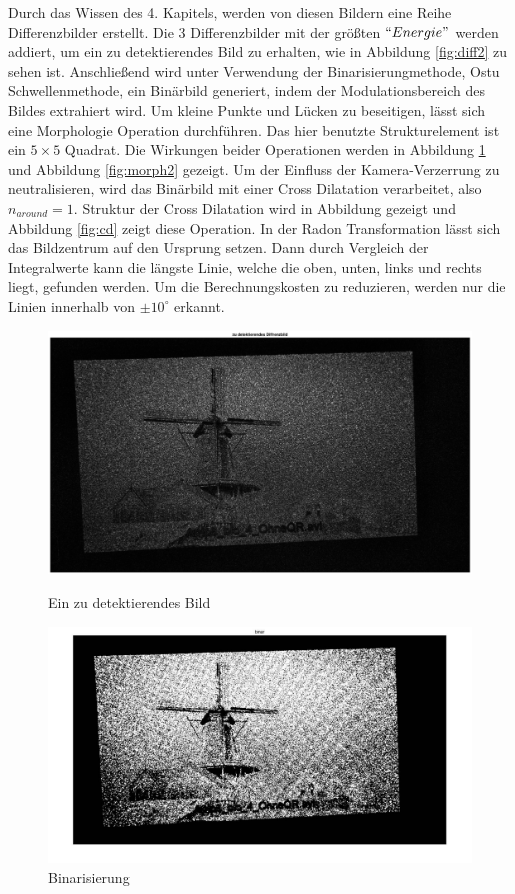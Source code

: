 Durch das Wissen des 4. Kapitels, werden von diesen Bildern eine Reihe Differenzbilder erstellt. Die 3 Differenzbilder mit der größten $``Energie"$ werden addiert, um ein zu detektierendes Bild zu erhalten, wie in Abbildung \ref{fig:diff2} zu sehen ist. Anschließend wird unter Verwendung der Binarisierungmethode, Ostu Schwellenmethode, ein Binärbild generiert, indem der Modulationsbereich des Bildes extrahiert wird. Um kleine Punkte und Lücken zu beseitigen, lässt sich eine Morphologie Operation durchführen. Das hier benutzte Strukturelement ist ein $5 \times 5$ Quadrat. Die Wirkungen beider Operationen werden in Abbildung \ref{fig:binar2} und Abbildung \ref{fig:morph2} gezeigt. Um der Einfluss der Kamera-Verzerrung zu neutralisieren, wird das Binärbild mit einer Cross Dilatation verarbeitet, also $ n_{around} = 1$. Struktur der Cross Dilatation wird in Abbildung gezeigt und Abbildung \ref{fig:cd} zeigt diese Operation. 
In der Radon Transformation lässt sich das Bildzentrum auf den Ursprung setzen. Dann durch Vergleich der Integralwerte kann die längste Linie, welche die oben, unten, links und rechts liegt, gefunden werden. Um die Berechnungskosten zu reduzieren, werden nur die Linien innerhalb von $ \pm 10^{\circ} $ erkannt. 
\begin{figure}[H]
\centering 
\begin{minipage}[b]{0.49\textwidth} 
\centering 
\includegraphics[width=1.06\textwidth]{images/5_Implementirung/2/diff.eps} 
\caption{Ein zu detektierendes Bild}
\label{fig:diff2}
\end{minipage}
\begin{minipage}[b]{0.49\textwidth} 
\centering 
\includegraphics[width=1.0\textwidth]{images/5_Implementirung/2/bina.pdf}
\caption{Binarisierung}
\label{fig:binar2}
\end{minipage}
\end{figure}


